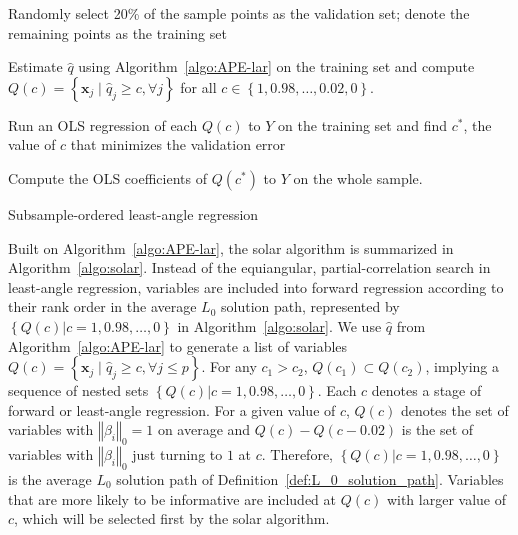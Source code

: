 \documentclass[12pt]{article}
\begin{document}


\begin{algorithm}[h]


  \smallskip
  Randomly select 20\% of the sample points as the validation set; denote the remaining points as the training set\;

  Estimate $\widehat{q}$ using Algorithm~\ref{algo:APE-lar} on the training set and compute $Q(c) = \left\{ \mathbf{x}_j \; \vert \; \widehat{q}_j \geqslant c, \forall j\right\}$ for all $c \in \left\{ 1, 0.98, \ldots, 0.02, 0 \right\}.$

  Run an OLS regression of each $Q(c)$ to $Y$ on the training set and find $c^*$, the value of $c$ that minimizes the validation error\;

  Compute the OLS coefficients of $Q(c^*)$ to $Y$ on the whole sample.

  \caption{Subsample-ordered least-angle regression \label{algo:solar}}
\end{algorithm}

Built on Algorithm~\ref{algo:APE-lar}, the solar algorithm is summarized in Algorithm~\ref{algo:solar}. Instead of the equiangular, partial-correlation search in least-angle regression, variables are included into forward regression according to their rank order in the average $L_0$ solution path, represented by $\left\{ Q(c) \vert c = 1, 0.98, \ldots, 0\right\}$ in Algorithm~\ref{algo:solar}. We use $\widehat{q}$ from Algorithm~\ref{algo:APE-lar} to generate a list of variables $Q \left( c \right) = \left\{ \mathbf{x}_j \; \vert \; \widehat{q}_j \geqslant c, \forall j \leqslant p \right\}$. For any $c_1 > c_2$, $Q\left(c_1\right) \subset Q\left(c_2\right)$, implying a sequence of nested sets $\left\{ Q(c) \vert c = 1, 0.98, \ldots, 0\right\}$. Each $c$ denotes a stage of forward or least-angle regression. For a given value of $c$, $Q(c)$ denotes the set of variables with $\left\Vert \beta_i \right\Vert_0=1$ on average and $Q(c) - Q(c - 0.02)$ is the set of variables with $\left\Vert \beta_i \right\Vert_0$ just turning to $1$ at $c$. Therefore, $\left\{ Q(c) \vert c = 1, 0.98, \ldots, 0\right\}$ is the average $L_0$ solution path of Definition~\ref{def:L_0_solution_path}. Variables that are more likely to be informative are included at $Q(c)$ with larger value of $c$, which will be selected first by the solar algorithm.
\end{document}
